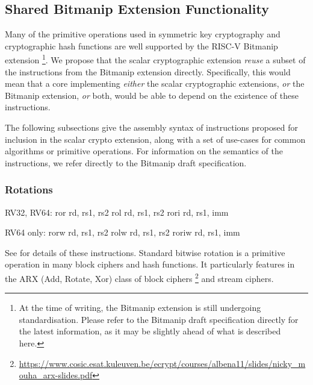 

\subsection{Shared Bitmanip Extension Functionality}

Many of the primitive operations used in symmetric key cryptography
and cryptographic hash functions are well supported by the
RISC-V Bitmanip \cite{riscv:bitmanip:repo} extension
\footnote{
At the time of writing, the Bitmanip extension is still undergoing
standardisation.
Please refer to the Bitmanip draft specification
\cite{riscv:bitmanip:draft}
directly for the
latest information, as it may be slightly ahead of what is described
here.
}.
We propose that the scalar cryptographic extension {\em reuse} a
subset of the instructions from the Bitmanip extension directly.
Specifically, this would mean that
a core implementing
{\em either}
the scalar cryptographic extensions,
{\em or}
the Bitmanip extension,
{\em or}
both,
would be able to depend on the existence of these instructions.

%
%

The following subsections give the assembly syntax of instructions
proposed for inclusion in the scalar crypto extension, along with a
set of use-cases for common algorithms or primitive operations.
For information on the semantics of the instructions, we refer directly
to the Bitmanip draft specification.

\subsubsection{Rotations}

\begin{cryptobitmanipisa}
RV32, RV64:
    ror    rd, rs1, rs2
    rol    rd, rs1, rs2
    rori   rd, rs1, imm

RV64 only:
    rorw   rd, rs1, rs2
    rolw   rd, rs1, rs2
    roriw  rd, rs1, imm
\end{cryptobitmanipisa}

See \cite[Section 3.1.1]{riscv:bitmanip:draft} for details of
these instructions.
Standard bitwise rotation is a primitive operation in many block ciphers and
hash functions.
It particularly features in the ARX (Add, Rotate, Xor) class of
block ciphers
\footnote{\url{https://www.cosic.esat.kuleuven.be/ecrypt/courses/albena11/slides/nicky_mouha_arx-slides.pdf}}
and stream ciphers.

